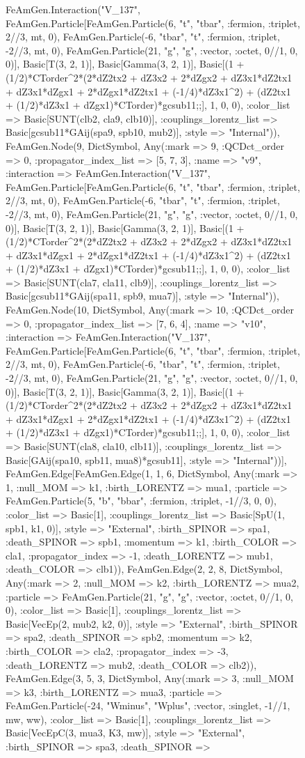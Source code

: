 \documentclass{revtex4}
\begin{document}
\begin{figure}[!htb]
\begin{center}
{FeAmGen.Interaction("V_137", FeAmGen.Particle[FeAmGen.Particle(6, "t", "tbar", :fermion, :triplet, 2//3, mt, 0), FeAmGen.Particle(-6, "tbar", "t", :fermion, :triplet, -2//3, mt, 0), FeAmGen.Particle(21, "g", "g", :vector, :octet, 0//1, 0, 0)], Basic[T(3, 2, 1)], Basic[Gamma(3, 2, 1)], Basic[(1 + (1/2)*CTorder^2*(2*dZ2tx2 + dZ3x2 + 2*dZgx2 + dZ3x1*dZ2tx1 + dZ3x1*dZgx1 + 2*dZgx1*dZ2tx1 + (-1/4)*dZ3x1^2) + (dZ2tx1 + (1/2)*dZ3x1 + dZgx1)*CTorder)*gcsub11;;], 1, 0, 0), :color_list => Basic[SUNT(clb2, cla9, clb10)], :couplings_lorentz_list => Basic[gcsub11*GAij(spa9, spb10, mub2)], :style => "Internal")), FeAmGen.Node(9, Dict{Symbol, Any}(:mark => 9, :QCDct_order => 0, :propagator_index_list => [5, 7, 3], :name => "v9", :interaction => FeAmGen.Interaction("V_137", FeAmGen.Particle[FeAmGen.Particle(6, "t", "tbar", :fermion, :triplet, 2//3, mt, 0), FeAmGen.Particle(-6, "tbar", "t", :fermion, :triplet, -2//3, mt, 0), FeAmGen.Particle(21, "g", "g", :vector, :octet, 0//1, 0, 0)], Basic[T(3, 2, 1)], Basic[Gamma(3, 2, 1)], Basic[(1 + (1/2)*CTorder^2*(2*dZ2tx2 + dZ3x2 + 2*dZgx2 + dZ3x1*dZ2tx1 + dZ3x1*dZgx1 + 2*dZgx1*dZ2tx1 + (-1/4)*dZ3x1^2) + (dZ2tx1 + (1/2)*dZ3x1 + dZgx1)*CTorder)*gcsub11;;], 1, 0, 0), :color_list => Basic[SUNT(cla7, cla11, clb9)], :couplings_lorentz_list => Basic[gcsub11*GAij(spa11, spb9, mua7)], :style => "Internal")), FeAmGen.Node(10, Dict{Symbol, Any}(:mark => 10, :QCDct_order => 0, :propagator_index_list => [7, 6, 4], :name => "v10", :interaction => FeAmGen.Interaction("V_137", FeAmGen.Particle[FeAmGen.Particle(6, "t", "tbar", :fermion, :triplet, 2//3, mt, 0), FeAmGen.Particle(-6, "tbar", "t", :fermion, :triplet, -2//3, mt, 0), FeAmGen.Particle(21, "g", "g", :vector, :octet, 0//1, 0, 0)], Basic[T(3, 2, 1)], Basic[Gamma(3, 2, 1)], Basic[(1 + (1/2)*CTorder^2*(2*dZ2tx2 + dZ3x2 + 2*dZgx2 + dZ3x1*dZ2tx1 + dZ3x1*dZgx1 + 2*dZgx1*dZ2tx1 + (-1/4)*dZ3x1^2) + (dZ2tx1 + (1/2)*dZ3x1 + dZgx1)*CTorder)*gcsub11;;], 1, 0, 0), :color_list => Basic[SUNT(cla8, cla10, clb11)], :couplings_lorentz_list => Basic[GAij(spa10, spb11, mua8)*gcsub11], :style => "Internal"))], FeAmGen.Edge[FeAmGen.Edge(1, 1, 6, Dict{Symbol, Any}(:mark => 1, :null_MOM => k1, :birth_LORENTZ => mua1, :particle => FeAmGen.Particle(5, "b", "bbar", :fermion, :triplet, -1//3, 0, 0), :color_list => Basic[1], :couplings_lorentz_list => Basic[SpU(1, spb1, k1, 0)], :style => "External", :birth_SPINOR => spa1, :death_SPINOR => spb1, :momentum => k1, :birth_COLOR => cla1, :propagator_index => -1, :death_LORENTZ => mub1, :death_COLOR => clb1)), FeAmGen.Edge(2, 2, 8, Dict{Symbol, Any}(:mark => 2, :null_MOM => k2, :birth_LORENTZ => mua2, :particle => FeAmGen.Particle(21, "g", "g", :vector, :octet, 0//1, 0, 0), :color_list => Basic[1], :couplings_lorentz_list => Basic[VecEp(2, mub2, k2, 0)], :style => "External", :birth_SPINOR => spa2, :death_SPINOR => spb2, :momentum => k2, :birth_COLOR => cla2, :propagator_index => -3, :death_LORENTZ => mub2, :death_COLOR => clb2)), FeAmGen.Edge(3, 5, 3, Dict{Symbol, Any}(:mark => 3, :null_MOM => k3, :birth_LORENTZ => mua3, :particle => FeAmGen.Particle(-24, "Wminus", "Wplus", :vector, :singlet, -1//1, mw, ww), :color_list => Basic[1], :couplings_lorentz_list => Basic[VecEpC(3, mua3, K3, mw)], :style => "External", :birth_SPINOR => spa3, :death_SPINOR => }
\end{center}
\end{figure}
\end{document}
